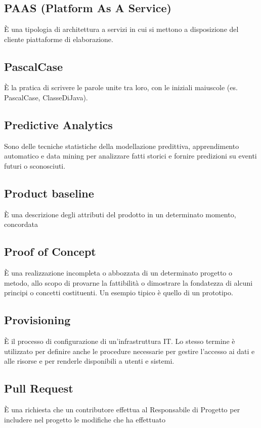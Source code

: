 \section{}
\subsection*{PAAS (Platform As A Service)} È una tipologia di architettura a servizi in cui si mettono a disposizione del cliente piattaforme di elaborazione.

\subsection*{PascalCase} È la pratica di scrivere le parole unite tra loro, con le iniziali maiuscole (es. PascalCase, ClasseDiJava).

\subsection*{Predictive Analytics} Sono delle tecniche statistiche della modellazione predittiva, apprendimento automatico e data mining per analizzare fatti storici e fornire predizioni su eventi futuri o sconosciuti.

\subsection*{Product baseline} È una descrizione degli attributi del prodotto in un determinato momento, concordata

\subsection*{Proof of Concept} È una realizzazione incompleta o abbozzata di un determinato progetto o metodo, allo scopo di provarne la fattibilità o dimostrare la fondatezza di alcuni principi o concetti costituenti. Un esempio tipico è quello di un prototipo.

\subsection*{Provisioning} È il processo di configurazione di un'infrastruttura IT.
Lo stesso termine è utilizzato per definire anche le procedure necessarie per gestire l'accesso ai dati e alle risorse e per renderle disponibili a utenti e sistemi.

\subsection*{Pull Request} È una richiesta che un contributore effettua al Responsabile di Progetto per includere nel progetto le modifiche che ha effettuato
\newpage